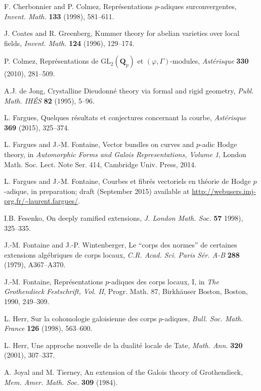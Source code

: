 \documentclass[12pt]{amsart}
\theoremstyle{definition}
\numberwithin{equation}{theorem}
\begin{document}
\begin{thebibliography}{99}
F. Cherbonnier and P. Colmez, Repr\'esentations $p$-adiques surconvergentes,
\textit{Invent. Math.} \textbf{133} (1998), 581--611.

J. Coates and R. Greenberg, Kummer theory for abelian varieties over local fields,
\textit{Invent. Math.} \textbf{124} (1996), 129--174.

P. Colmez,
 Repr\'esentations de $\mathrm{GL}_2(\mathbf{Q}_p)$ et $(\varphi, \Gamma)$-modules,
 \textit{Ast\'erisque} \textbf{330} (2010), 281--509.
 
A.J. de Jong, Crystalline Dieudonn\'e theory via formal and rigid geometry,
\textit{Publ. Math. IH\'ES} \textbf{82} (1995), 5--96.

L. Fargues, Quelques r\'esultats et conjectures concernant la courbe,
\textit{Ast\'erisque} \textbf{369} (2015), 325--374.

L. Fargues and J.-M. Fontaine, Vector bundles on curves and $p$-adic Hodge theory,
in \textit{Automorphic Forms and Galois Representations, Volume 1},
London Math. Soc. Lect. Note Ser. 414, Cambridge Univ. Press, 2014.

L. Fargues and J.-M. Fontaine, Courbes et fibr\'es vectoriels en th\'eorie de Hodge
$p$-adique, in preparation; draft (September 2015) available at
\url{http://webusers.imj-prg.fr/~laurent.fargues/}.

I.B. Fesenko, On deeply ramified extensions,
\textit{J. London Math. Soc.} \textbf{57} 1998), 325--335.

J.-M. Fontaine and J.-P. Wintenberger,
Le ``corps des normes'' de certaines extensions alg\'ebriques
de corps locaux,
\textit{C.R. Acad. Sci. Paris S\'er. A-B} \textbf{288} (1979), A367--A370.

J.-M. Fontaine, Repr\'esentations $p$-adiques des corps locaux, I,
in \textit{The Grothendieck Festschrift, Vol. II},
Progr. Math. 87, Birkh\"auser Boston, Boston, 1990, 249--309.

L. Herr, Sur la cohomologie galoisienne des corps $p$-adiques, \textit{Bull. Soc. Math. France} \textbf{126} (1998), 563--600.

L. Herr, Une approche nouvelle de la dualit\'e locale de Tate,
\textit{Math. Ann.} \textbf{320} (2001), 307--337.

A. Joyal and M. Tierney, An extension of the Galois theory of Grothendieck,
\textit{Mem. Amer. Math. Soc.} \textbf{309} (1984).


\end{thebibliography}
\end{document}
